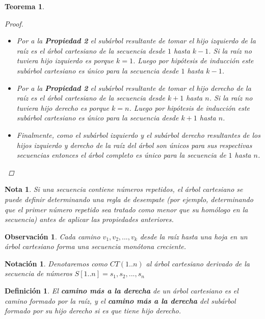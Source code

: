 \documentclass[12pt]{article}
\newcommand{\ct}{árbol cartesiano }
\newcommand{\rmp}{camino más a la derecha }
\newtheorem{theorem}{Teorema}
\newtheorem{definition}{Definición}
\newtheorem{proof}{Demostración}
\newtheorem{note}{Nota}
\newtheorem{observation}{Observación}
\newtheorem{notation}{Notación}
\begin{document}
\begin{theorem}
\begin{proof}
\begin{itemize}
			\item Por a la \textbf{Propiedad 2} el subárbol resultante de tomar el hijo izquierdo de la raíz es el \ct de la secuencia desde $1$ hasta $k - 1$. Si la raíz no tuviera hijo izquierdo es porque $k = 1$. Luego por hipótesis de inducción este subárbol cartesiano es único para la secuencia desde $1$ hasta $k - 1$.
			\item Por a la \textbf{Propiedad 2} el subárbol resultante de tomar el hijo derecho de la raíz es el \ct de la secuencia desde $k + 1$ hasta $n$. Si la raíz no tuviera hijo derecho es porque $k = n$. Luego por hipótesis de inducción este subárbol cartesiano es único para la secuencia desde $k + 1$ hasta $n$.
			\item Finalmente, como el subárbol izquierdo y el subárbol derecho resultantes de los hijos izquierdo y derecho de la raíz del árbol son únicos para sus respectivas secuencias entonces el árbol completo es único para la secuencia de $1$ hasta $n$. 
		\end{itemize}
	\end{proof}
\end{theorem}

\begin{note}
	Si una secuencia contiene números repetidos, el \ct se puede definir determinando una regla de desempate (por ejemplo, determinando que el primer número repetido sea tratado como menor que su homólogo en la secuencia) antes de aplicar las propiedades anteriores.
\end{note}

\begin{observation}
	Cada camino $v_1, v_2, ... , v_k$ desde la raíz hasta una hoja en un \ct forma una secuencia monótona creciente.
\end{observation}

\begin{notation}
	Denotaremos como $CT(1..n)$ al \ct derivado de la secuencia de números $S[1..n] = s_1, s_2, ... , s_n$
\end{notation}

\begin{definition}
	El \textbf{\rmp}de un \ct es el camino formado por la raíz, y el \textbf{\rmp}del subárbol formado por su hijo derecho si es que tiene hijo derecho.
\end{definition}
\end{document}
